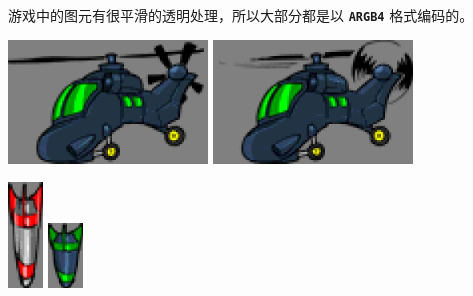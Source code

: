 \documentclass[10pt]{book}
\newcommand{\mach}[1]{\texttt{\textbf{#1}}}
\begin{document}
\begin{CJK}{UTF8}{gkai}
\newpage

游戏中的图元有很平滑的透明处理，所以大部分都是以 \mach{ARGB4} 格式编码的。

\begin{center}
\includegraphics[width=150pt]{previews/nightstrike_1-HELI-00.png}
\includegraphics[width=150pt]{previews/nightstrike_1-HELI-01.png}
\end{center}

\begin{center}
\includegraphics[width=0.07\textwidth]{previews/nightstrike_0-MISSILE_A-00.png}
\includegraphics[width=0.07\textwidth]{previews/nightstrike_0-MISSILE_C-00.png}
\end{center}


\end{CJK}
\end{document}
